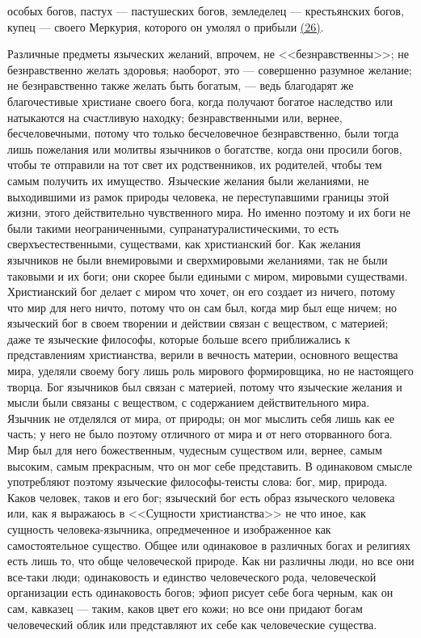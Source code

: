 \documentclass[12pt]{article}
\begin{document}
особых богов, пастух --- пастушеских богов, земледелец --- крестьянских богов, купец --- своего Меркурия, которого он умолял о прибыли \hyperlink{26}{(26)}\hypertarget{b26}{}. 

Различные предметы языческих желаний, впрочем, не <<безнравственны>>; не безнравственно желать здоровья; наоборот, это --- совершенно разумное желание; не безнравственно также желать быть богатым, --- ведь благодарят же благочестивые христиане своего бога, когда получают богатое наследство или натыкаются на счастливую находку; безнравственными или, вернее, бесчеловечными, потому что только бесчеловечное безнравственно, были тогда лишь пожелания или молитвы язычников о богатстве, когда они просили богов, чтобы те отправили на тот свет их родственников, их родителей, чтобы тем самым получить их имущество. Языческие желания были желаниями, не выходившими из рамок природы человека, не переступавшими границы этой жизни, этого действительно чувственного мира. Но именно поэтому и их боги не были такими неограниченными, супранатуралистическими, то есть сверхъестественными, существами, как христианский бог. Как желания язычников не были внемировыми и сверхмировыми желаниями, так не были таковыми и их боги; они скорее были едиными с миром, мировыми существами. Христианский бог делает с миром что хочет, он его создает из ничего, потому что мир для него ничто, потому что он сам был, когда мир был еще ничем; но языческий бог в своем творении и действии связан с веществом, с материей; даже те языческие философы, которые больше всего приближались к представлениям христианства, верили в вечность материи, основного вещества мира, уделяли своему богу лишь роль мирового формировщика, но не настоящего творца. Бог язычников был связан с материей, потому что языческие желания и мысли были связаны с веществом, с содержанием действительного мира. Язычник не отделялся от мира, от природы; он мог мыслить себя лишь как ее часть; у него не было поэтому отличного от мира и от него оторванного бога. Мир был для него божественным, чудесным существом или, вернее, самым высоким, самым прекрасным, что он мог себе представить. В одинаковом смысле употребляют поэтому языческие философы-теисты слова: бог, мир, природа. Каков человек, таков и его бог; языческий бог есть образ языческого человека или, как я выражаюсь в <<Сущности христианства>>  не что иное, как сущность человека-язычника, опредмеченное и изображенное как самостоятельное существо. Общее или одинаковое в различных богах и религиях есть лишь то, что обще человеческой природе. Как ни различны люди, но все они все-таки люди; одинаковость и единство человеческого рода, человеческой организации есть одинаковость богов; эфиоп рисует себе бога черным, как он сам, кавказец --- таким, каков цвет его кожи; но все они придают богам человеческий облик или представляют их себе как человеческие существа. 
\end{document}
